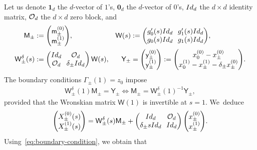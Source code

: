 \documentclass[10pt,a4paper]{amsart}
\theoremstyle{definition}
\newcommand{\sW}{{\mathsf W}}
\newcommand{\I}{\textup{Id}}\let\Id\I
\newcommand{\U}{\mathbf{1}}
\newcommand{\V}{\mathbf{0}}
\begin{document}
Let us denote $\U_d$ the $d$-vector of $1$'s, $\V_d$ the
$d$-vector of $0$'s, $\I_d$ the $d\times d$ identity matrix,
${\mathcal O}_d$ the $d\times d$ zero block, and
\begin{align*}
\mathsf M_\pm &:=\arraycolsep3.5pt
\begin{pmatrix}
\mathsf m^{(0)}_\pm \\
\mathsf m^{(1)} _\pm
\end{pmatrix}\!, &
\sW(s) &:=\arraycolsep3.5pt
\begin{pmatrix}
g_0'(s) \I_d & g_1 '(s) \I_d \\
g_0(s) \I_d & g_1(s) \I_d
\end{pmatrix}\!, \\
\sW_\pm ^\delta (s) &:=\arraycolsep3.5pt
\begin{pmatrix}
\I_d & \OO_d \\
\OO_d & \delta_\pm \I_d
\end{pmatrix} \sW(s), &
\mathsf Y_\pm &=\arraycolsep3.5pt
\begin{pmatrix}
\mathsf y^{(0)} _\pm \\
\mathsf y^{(1)} _\pm
\end{pmatrix}
:=
\begin{pmatrix}
x^{(0)}_0 - x^{(0)}_\pm \\
x^{(1)}_0 - x^{(1)}_\pm - \delta_\pm x^{(0)}_\pm
\end{pmatrix}\!.
\end{align*}
The boundary conditions $\Gamma_\pm(1)=z_0$ impose
\begin{align}\label{eq:boundary-condition}
\sW_\pm ^\delta(1) \mathsf M_\pm = \mathsf Y_\pm \iff
\mathsf M_\pm = \sW_\pm ^\delta(1)^{-1} \mathsf Y_\pm,
\end{align}
provided that the Wronskian matrix $\sW(1)$ is invertible at
$s=1$. We~deduce
\begin{align*}\arraycolsep3.5pt
\begin{pmatrix}
X^{(0)}_\pm (s) \\
X^{(1)}_\pm (s)
\end{pmatrix}
= \sW_\pm ^\delta(s) \mathsf M_\pm +
\begin{pmatrix}
\I_d & \OO_d \\
\delta_\pm s \I_d & \I_d
\end{pmatrix}
\begin{pmatrix}
x_\pm^{(0)}\\
x_\pm^{(1)}
\end{pmatrix}\!.
\end{align*}
Using~\eqref{eq:boundary-condition}, we obtain that
\end{document}
